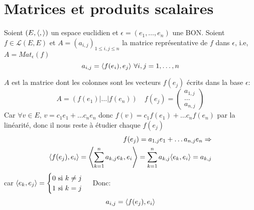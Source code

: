\section{Matrices et produits scalaires}
\begin{prop} Soient $(E, \left\langle , \right\rangle)$ un espace euclidien et $\epsilon = (e_1, \ldots, e_n)$ une BON. Soient $f \in \mathcal{L}(E, E)$ et $A = (a_{i,j})_{1 \le i,j \le n}$ la matrice représentative de $f$ dans  $\epsilon$, i.e,  $A = Mat_{\epsilon}(f)$ 
    \[
        a_{i,j} = \left\langle f(e_i), e_j \right\rangle \, \forall i,j = 1, \ldots, n
    \] 
\end{prop}
\begin{preuve}
   $A$ est la matrice dont les colonnes sont les vecteurs  $f(e_j)$ écrits dans la base $\epsilon$:
    \[
        A = (f(e_1) | \ldots | f(e_n))\quad f(e_j) = \begin{pmatrix} a_{1,j}\\ \ldots\\ a_{n, j} \end{pmatrix} 
   \] 
   Car $\forall v \in E, \, v = c_1e_1 + \ldots c_ne_n$ donc $f(v) = c_1f(e_1) + \ldots c_nf(e_n)$ par la linéarité, donc il nous reste à étudier chaque $f(e_j)$
   \begin{align*}
       f(e_j) = a_{1, j}e_1 + \ldots a_{n, j}e_n \Rightarrow\\
       \langle f(e_j), e_i \rangle = \left\langle \sum_{k=1}^n a_{k,j} e_k, e_i \right\rangle = \sum_{k=1}^{n} a_{k,j}\langle e_k, e_i \rangle = a_{k, j}
   \end{align*}
   car $\langle e_k, e_j \rangle = \begin{cases}
       0 \text{ si } k \neq j\\
       1 \text{ si } k = j
   \end{cases}$
   Donc:
   \[
       a_{i, j} = \left\langle f(e_j), e_i \right\rangle
   \] 
\end{preuve}



